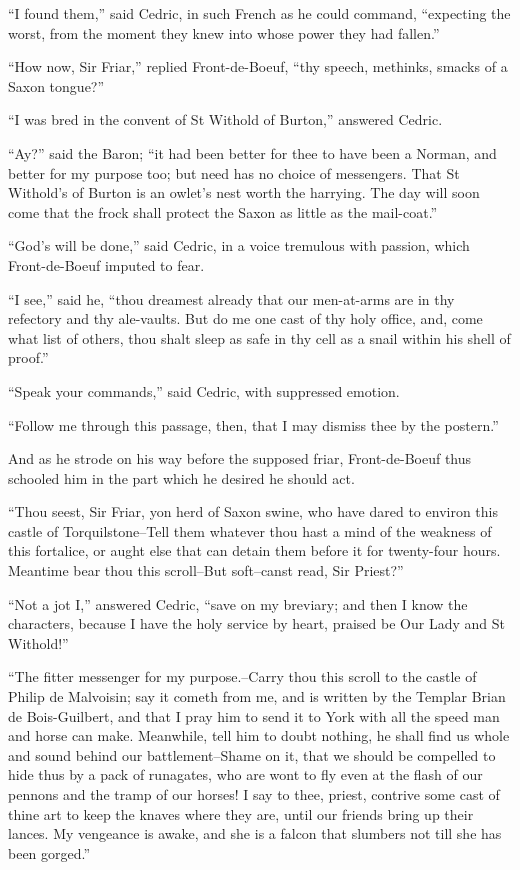 ``I found them,'' said Cedric, in such French as he could command,
``expecting the worst, from the moment they knew into whose power they
had fallen.''

``How now, Sir Friar,'' replied Front-de-Boeuf, ``thy speech, methinks,
smacks of a Saxon tongue?''

``I was bred in the convent of St Withold of Burton,'' answered Cedric.

``Ay?'' said the Baron; ``it had been better for thee to have been a
Norman, and better for my purpose too; but need has no choice of
messengers. That St Withold's of Burton is an owlet's nest worth the
harrying. The day will soon come that the frock shall protect the Saxon
as little as the mail-coat.''

``God's will be done,'' said Cedric, in a voice tremulous with passion,
which Front-de-Boeuf imputed to fear.

``I see,'' said he, ``thou dreamest already that our men-at-arms are in
thy refectory and thy ale-vaults. But do me one cast of thy holy office,
and, come what list of others, thou shalt sleep as safe in thy cell as a
snail within his shell of proof.''

``Speak your commands,'' said Cedric, with suppressed emotion.

``Follow me through this passage, then, that I may dismiss thee by the
postern.''

And as he strode on his way before the supposed friar, Front-de-Boeuf
thus schooled him in the part which he desired he should act.

``Thou seest, Sir Friar, yon herd of Saxon swine, who have dared to
environ this castle of Torquilstone--Tell them whatever thou hast a mind
of the weakness of this fortalice, or aught else that can detain them
before it for twenty-four hours. Meantime bear thou this scroll--But
soft--canst read, Sir Priest?''

``Not a jot I,'' answered Cedric, ``save on my breviary; and then I know
the characters, because I have the holy service by heart, praised be Our
Lady and St Withold!''

``The fitter messenger for my purpose.--Carry thou this scroll to the
castle of Philip de Malvoisin; say it cometh from me, and is written by
the Templar Brian de Bois-Guilbert, and that I pray him to send it to
York with all the speed man and horse can make. Meanwhile, tell him to
doubt nothing, he shall find us whole and sound behind our
battlement--Shame on it, that we should be compelled to hide thus by a
pack of runagates, who are wont to fly even at the flash of our pennons
and the tramp of our horses! I say to thee, priest, contrive some cast
of thine art to keep the knaves where they are, until our friends bring
up their lances. My vengeance is awake, and she is a falcon that
slumbers not till she has been gorged.''

